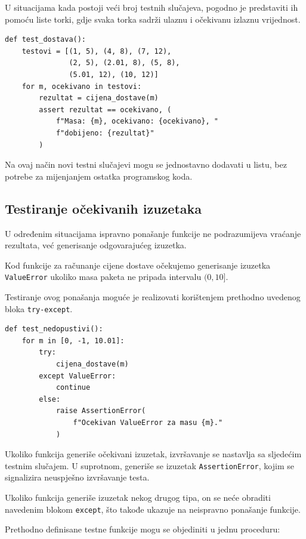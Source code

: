 U situacijama kada postoji veći broj testnih slučajeva, 
pogodno je predstaviti ih pomoću liste torki, gdje 
svaka torka sadrži ulaznu i očekivanu izlaznu vrijednost.

\begin{verbatim}
def test_dostava():
    testovi = [(1, 5), (4, 8), (7, 12),
               (2, 5), (2.01, 8), (5, 8),
               (5.01, 12), (10, 12)]
    for m, ocekivano in testovi:
        rezultat = cijena_dostave(m)
        assert rezultat == ocekivano, (
            f"Masa: {m}, ocekivano: {ocekivano}, "
            f"dobijeno: {rezultat}"
        )
\end{verbatim}

Na ovaj način novi testni slučajevi mogu se jednostavno 
dodavati u listu, bez potrebe za mijenjanjem ostatka 
programskog koda.


\subsection{Testiranje očekivanih izuzetaka}

U određenim situacijama ispravno ponašanje funkcije 
ne podrazumijeva vraćanje rezultata, već generisanje 
odgovarajućeg izuzetka.

Kod funkcije za računanje cijene dostave očekujemo 
generisanje izuzetka \texttt{ValueError} ukoliko 
masa paketa ne pripada intervalu $(0,10]$.

Testiranje ovog ponašanja moguće je realizovati 
korištenjem prethodno uvedenog bloka 
\texttt{try-except}.

\begin{verbatim}
def test_nedopustivi():
    for m in [0, -1, 10.01]:
        try:
            cijena_dostave(m)
        except ValueError:
            continue
        else:
            raise AssertionError(
                f"Ocekivan ValueError za masu {m}."
            )
\end{verbatim}

Ukoliko funkcija generiše očekivani izuzetak, 
izvršavanje se nastavlja sa sljedećim testnim slučajem. 
U suprotnom, generiše se izuzetak 
\texttt{AssertionError}, kojim se signalizira 
neuspješno izvršavanje testa.

Ukoliko funkcija generiše izuzetak nekog drugog tipa, 
on se neće obraditi navedenim blokom \texttt{except}, 
što takođe ukazuje na neispravno ponašanje funkcije.

Prethodno definisane testne funkcije mogu se objediniti 
u jednu proceduru:

